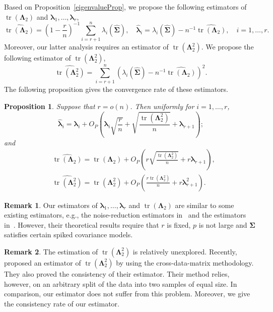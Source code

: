 \documentclass[12pt]{article} %
\DeclareMathOperator{\mytr}{tr}
\newcommand{\bZ}{\mathbf{Z}}
\newcommand{\bfsym}[1]{\ensuremath{\boldsymbol{#1}}}
\def\blambda {\bfsym {\lambda}}
\def\bLambda {\bfsym {\Lambda}}
\def\bSigma {\bfsym {\Sigma}}
\newtheorem{proposition}{Proposition}
\theoremstyle{definition}
\newtheorem{remark}{Remark}
\begin{document}
Based on Proposition~\ref{eigenvalueProp}, we propose the following estimators of  $\mytr(\bLambda_2)$ and $\blambda_1,\ldots,\blambda_r$,
\begin{equation*}
    \widehat{\mytr(\bLambda_2)}=\left(1-\frac{r}{n}\right)^{-1}\sum_{i=r+1}^n \lambda_i (\hat{\bSigma})
    ,\quad
    \hat{\blambda}_i=\lambda_i(\hat{\bSigma})-n^{-1}\widehat{\mytr(\bLambda_2)},\quad i=1,\ldots,r.
\end{equation*}
Moreover, our latter analysis requires an estimator of $\mytr(\bLambda_2^2)$.
We propose the following estimator of $\mytr(\bLambda_2^2)$,
\begin{equation*}
    \widehat{\mytr(\bLambda_2^2)}=\sum_{i=r+1}^n \left(\lambda_i(\hat{\bSigma})-n^{-1}\widehat{\mytr(\bLambda_2)}\right)^2.
\end{equation*}
The following proposition gives the convergence rate of these estimators.
\begin{proposition}
    \label{eigenvalueProp:R3}
    Suppose that $r=o(n)$.
    Then uniformly for $i=1,\ldots, r$, 
\begin{equation*}
    \hat{\blambda}_i
        =
        \blambda_i
        +O_P\left(\blambda_i \sqrt{\frac{r}{n}}+\sqrt{\frac{\mytr(\bLambda_2^2)}{ n}}+\blambda_{r+1}\right);
\end{equation*}
and
\begin{align*}
    &\widehat{\mytr(\bLambda_2)}=\mytr(\bLambda_2) + O_P\left(r\sqrt{\frac{\mytr(\bLambda_2^2)}{n}}+r\blambda_{r+1}\right),
        \\
&\widehat{\mytr(\bLambda_2^2)}
        =
         \mytr(\bLambda_2^2)
        +
        O_P\left(\frac{r \mytr(\bLambda_2^2)}{n} + r  \blambda_{r+1}^2\right).
\end{align*}
\end{proposition}
\begin{remark}
    Our estimators of $\blambda_1,\ldots, \blambda_r$ and $\mytr(\bLambda_2)$ are similar to some existing estimators, e.g., the noise-reduction estimators in~\cite{YATA2012193} and the estimators in~\cite{wang2017As}.
    However, their theoretical results require that $r$ is fixed, $p$ is not large and $\bSigma$ satisfies certain spiked covariance models.
\end{remark}

\begin{remark}
    The estimation of $\mytr(\bLambda_2^2)$ is relatively unexplored.
    Recently, \cite{Aoshima2018} proposed an estimator of $\mytr(\bLambda_2^2)$ by using the cross-data-matrix methodology.
    They also proved the consistency of their estimator.
    Their method relies, however,  on an arbitrary split of the data into two samples of equal size.
    In comparison, our estimator does not suffer from this problem.
    Moreover, we give the consistency rate of our estimator.
\end{remark}
\end{document}
